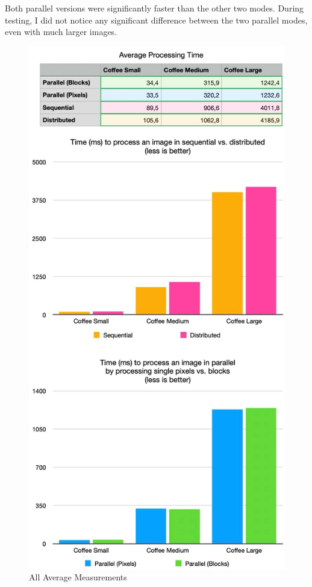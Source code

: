 \documentclass{article}
\begin{document}
\begin{multicols}{2}
    Both parallel versions were significantly faster than the other two modes. During testing, I did not notice any significant difference between the two parallel modes, even with much larger images.

    \begin{figure}[H]
        \centering
        \includegraphics[width=\linewidth]{img/average_detailed.jpg}
        \caption{All Average Measurements}
        \label{fig:distributed}
    \end{figure}


\end{multicols}
\end{document}
